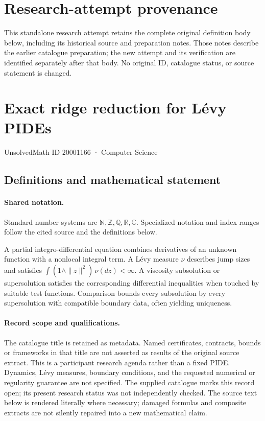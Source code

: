 \documentclass[11pt]{article}
\begin{document}
\section*{Research-attempt provenance}
This standalone research attempt retains the complete original definition body below,
including its historical source and preparation notes. Those notes describe the
earlier catalogue preparation; the new attempt and its verification are identified
separately after that body. No original ID, catalogue status, or source statement is changed.

\section{Exact ridge reduction for Lévy PIDEs}\label{20001166}
{\small UnsolvedMath ID 20001166 · Computer Science}
\subsection{Definitions and mathematical statement}

\paragraph{Shared notation.}Standard number systems are $\mathbb N,\mathbb Z,\mathbb Q,\mathbb R,\mathbb C$. Specialized notation and index ranges follow the cited source and the definitions below.


A partial integro-differential equation combines derivatives of an unknown function with a nonlocal integral term. A Lévy measure $\nu$ describes jump sizes and satisfies $\int(1\wedge\|z\|^2)\,\nu(dz)<\infty$. A viscosity subsolution or supersolution satisfies the corresponding differential inequalities when touched by suitable test functions. Comparison bounds every subsolution by every supersolution with compatible boundary data, often yielding uniqueness.
\paragraph{Record scope and qualifications.}
The catalogue title is retained as metadata. Named certificates, contracts, bounds or frameworks in that title are not asserted as results of the original source extract.
This is a participant research agenda rather than a fixed PIDE. Dynamics, Lévy measures, boundary conditions, and the requested numerical or regularity guarantee are not specified. The supplied catalogue marks this record open; its present research status was not independently checked.
The source text below is rendered literally where necessary; damaged formulas and composite extracts are not silently repaired into a new mathematical claim.
\end{document}
